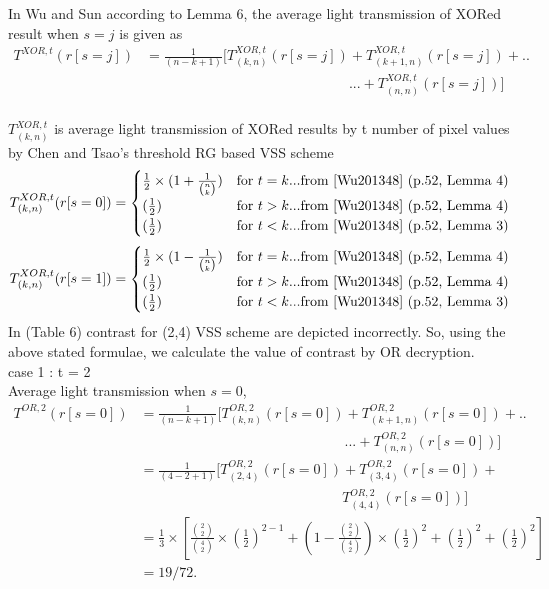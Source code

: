 In Wu and Sun\cite{Wu201348} according to Lemma 6, the average light transmission of XORed result when $s = j$  is given as 
\begin{align*}
T^{XOR,t}(r[s=j]) &=\frac{1}{(n-k+1)} [T^{XOR,t}_{(k,n)} (r[s=j]) + T^{XOR,t}_{(k+1,n)} (r[s=j]) + ..\\& \phantom{{} =\frac{1}{(n-k+1)} [T^{XOR,t}_{(k,n)} (r[s=j])}... + T^{XOR,t}_{(n,n)} (r[s=j])]
\end{align*}\\
$T^{XOR,t}_{(k,n)}$ is average light transmission of XORed results by t number of pixel values by Chen and Tsao's\cite{Chen20111197} threshold RG based VSS scheme\\
\begin{gather*}
T^{XOR,t}_{(k,n)}(r[s=0])=
\begin{cases}
\frac {1}{2} \times (1 + \frac {1}{\binom nk}) & \text{for } t = k  ...\text{from \cite{Wu201348} (p.52, Lemma 4)}\\
(\frac{1}{2}) & \text{for } t > k  ...\text{from \cite{Wu201348} (p.52, Lemma 4)}\\
(\frac{1}{2}) & \text{for } t < k  ...\text{from \cite{Wu201348} (p.52, Lemma 3)}\\
\end{cases}
\end{gather*}
\begin{gather*}
T^{XOR,t}_{(k,n)}(r[s=1])=
\begin{cases}
 \frac {1}{2} \times (1 - \frac {1}{\binom nk}) & \text{for } t = k  ...\text{from \cite{Wu201348} (p.52, Lemma 4)}\\
(\frac{1}{2}) & \text{for } t > k  ...\text{from \cite{Wu201348} (p.52, Lemma 4)}\\
(\frac{1}{2}) & \text{for } t < k  ...\text{from \cite{Wu201348} (p.52, Lemma 3)}\\
\end{cases}
\end{gather*}
In \cite{Wu201348}(Table 6) contrast for (2,4) VSS scheme are depicted incorrectly. So, using the above stated formulae, we calculate the value of contrast by OR decryption.\\
case 1 : t = 2\\
Average light transmission when $s=0$,
\begin{align*}
T^{OR,2}(r[s=0]) &= \frac{1}{(n-k+1)} [T^{OR,2}_{(k,n)} (r[s=0]) + T^{OR,2}_{(k+1,n)} (r[s=0]) + ..\\&\phantom{{}=\frac{1}{(n-k+1)} [T^{OR,2}_{(k,n)} (r[s=0])}... + T^{OR,2}_{(n,n)} (r[s=0])]\\
&= \frac{1}{(4-2+1)} [T^{OR,2}_{(2,4)} (r[s=0]) + T^{OR,2}_{(3,4)} (r[s=0]) + \\&\phantom{{}= \frac{1}{(4-2+1)} [T^{OR,2}_{(2,4)} (r[s=0])}T^{OR,2}_{(4,4)} (r[s=0])]\\
&= \frac{1}{3} \times [ \frac {\binom 22}{\binom 42} \times (\frac{1}{2})^{2-1} +  (1-  \frac {\binom 22}{\binom 42})\times (\frac{1}{2})^{2} + (\frac{1}{2})^{2} + (\frac{1}{2})^{2}]\\
& = 19/72.
\end{align*}
